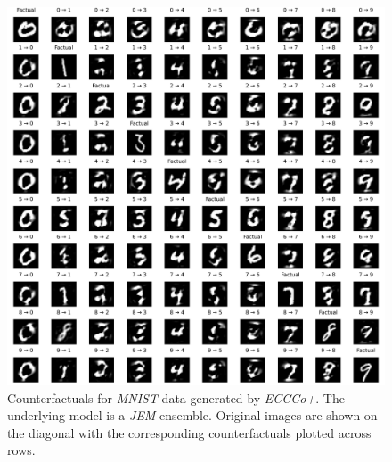 \begin{figure}
  \centering
  \includegraphics[width=1.0\linewidth]{../www/mnist_all_jem_ens_eccco.png}
  \caption{Counterfactuals for \textit{MNIST} data generated by \textit{ECCCo+}. The underlying model is a \textit{JEM} ensemble. Original images are shown on the diagonal with the corresponding counterfactuals plotted across rows.}\label{fig:mnist-eccco-jem-ens}
\end{figure}


